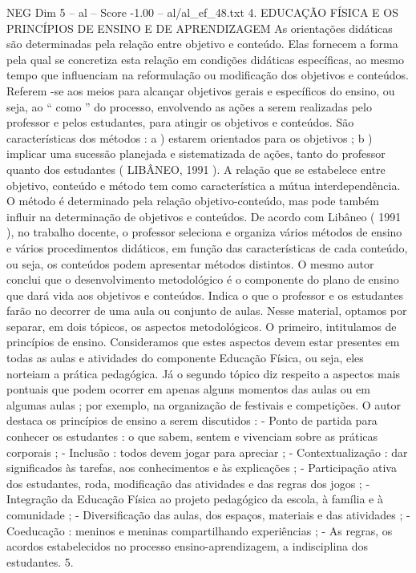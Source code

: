 \begin{textsample}{NEG Dim 5 – al – Score -1.00 – al/al\_ef\_48.txt}  \label{ex:f5_neg_242}
4.
EDUCAÇÃO FÍSICA E OS PRINCÍPIOS DE ENSINO E DE APRENDIZAGEM As orientações didáticas são determinadas pela relação entre objetivo e conteúdo.
Elas fornecem a forma pela qual se concretiza esta relação em condições didáticas específicas, ao mesmo tempo que influenciam na reformulação ou modificação dos objetivos e conteúdos.
Referem -se aos meios para alcançar objetivos gerais e específicos do ensino, ou seja, ao “ como ” do processo, envolvendo as ações a serem realizadas pelo professor e pelos estudantes, para atingir os objetivos e conteúdos.
São características dos métodos : a ) estarem orientados para os objetivos ; b ) implicar uma sucessão planejada e sistematizada de ações, tanto do professor quanto dos estudantes ( LIBÂNEO, 1991 ).
A relação que se estabelece entre objetivo, conteúdo e método tem como característica a mútua interdependência.
O método é determinado pela relação objetivo-conteúdo, mas pode também influir na determinação de objetivos e conteúdos.
De acordo com Libâneo ( 1991 ), no trabalho docente, o professor seleciona e organiza vários métodos de ensino e vários procedimentos didáticos, em função das características de cada conteúdo, ou seja, os conteúdos podem apresentar métodos distintos.
O mesmo autor conclui que o desenvolvimento metodológico é o componente do plano de ensino que dará vida aos objetivos e conteúdos.
Indica o que o professor e os estudantes farão no decorrer de uma aula ou conjunto de aulas.
Nesse material, optamos por separar, em dois tópicos, os aspectos metodológicos.
O primeiro, intitulamos de princípios de ensino.
Consideramos que estes aspectos devem estar presentes em todas as aulas e atividades do componente Educação Física, ou seja, eles norteiam a prática pedagógica.
Já o segundo tópico diz respeito a aspectos mais pontuais que podem ocorrer em apenas alguns momentos das aulas ou em algumas aulas ; por exemplo, na organização de festivais e competições.
O autor destaca os princípios de ensino a serem discutidos : - Ponto de partida para conhecer os estudantes : o que sabem, sentem e vivenciam sobre as práticas corporais ; - Inclusão : todos devem jogar para apreciar ; - Contextualização : dar significados às tarefas, aos conhecimentos e às explicações ; - Participação ativa dos estudantes, roda, modificação das atividades e das regras dos jogos ; - Integração da Educação Física ao projeto pedagógico da escola, à família e à comunidade ; - Diversificação das aulas, dos espaços, materiais e das atividades ; - Coeducação : meninos e meninas compartilhando experiências ; - As regras, os acordos estabelecidos no processo ensino-aprendizagem, a indisciplina dos estudantes. 5.

\end{textsample}
